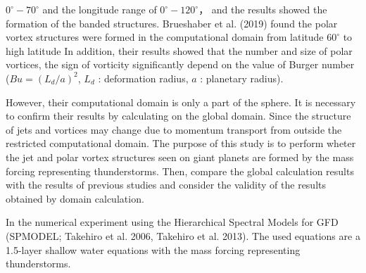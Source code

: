\documentclass[a4j,8pt]{jarticle}
\begin{document}
$0^\circ - 70^\circ$ and the longitude range of $0^\circ - 120^\circ$，
and the results showed the formation of the banded structures.
%
Brueshaber et al. (2019) found the polar vortex structures were formed
in the computational domain from latitude $60^\circ$ to high latitude
%
In addition, their results showed
that the number and size of polar vortices,
the sign of vorticity significantly depend on
the value of Burger number ($Bu = (L_d/a)^2$, $L_d$ : deformation radius, $a$ : planetary radius).

However, their computational domain is only a part of the sphere.
It is necessary to confirm their results by calculating on the global domain.
Since the structure of jets and vortices may change due to momentum transport from
outside the restricted computational domain.
%
The purpose of this study is to perform
wheter the jet and polar vortex structures seen on giant planets are
formed by the mass forcing representing thunderstorms.
%
Then, compare the global calculation results with the results of previous studies
and consider the validity of the results obtained by domain calculation.

In the numerical experiment using the Hierarchical Spectral Models for GFD (SPMODEL; Takehiro et al. 2006, Takehiro et al. 2013).
%
The used equations are a 1.5-layer shallow water equations
with the mass forcing representing thunderstorms.
%
\end{document}
